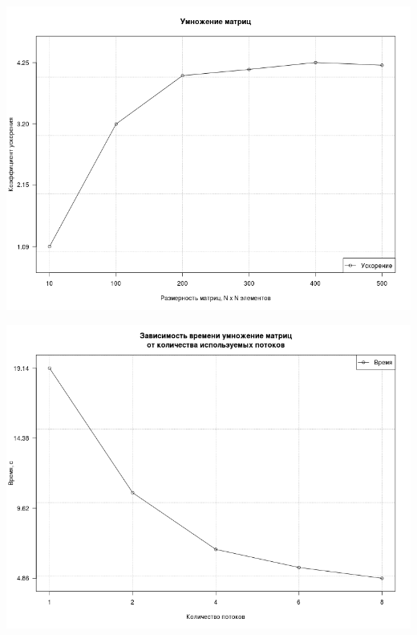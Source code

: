 \begin{frame}[allowframebreaks]
\begin{center}
\includegraphics[scale=0.38]{../Paper/Figures/MultiplicationAcceleration}

\includegraphics[scale=0.38]{../Paper/Figures/ThreadsNumberTime}
\end{center}

\end{frame}